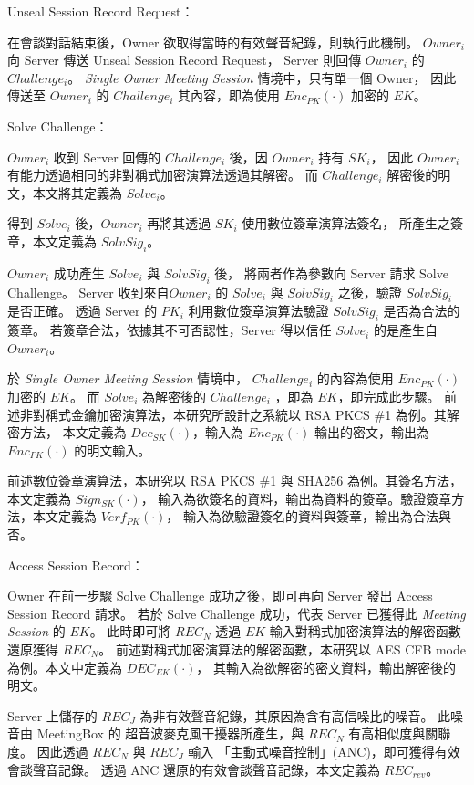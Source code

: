 \begin{steps}
    \item Unseal Session Record Request：

            在會談對話結束後，Owner 欲取得當時的有效聲音紀錄，則執行此機制。
        $Owner_{i}$ 向 Server 傳送 Unseal Session Record Request，
        Server 則回傳 $Owner_{i}$ 的 $Challenge_{i}$。
        {\it Single Owner Meeting Session} 情境中，只有單一個 Owner，
        因此傳送至 $Owner_{i}$ 的 $Challenge_{i}$ 其內容，即為使用 $Enc_{PK}(·)$ 加密的 $EK$。

    \item Solve Challenge：

            $Owner_{i}$ 收到 Server 回傳的 $Challenge_{i}$ 後，因 $Owner_{i}$ 持有 $SK_{i}$，
        因此 $Owner_{i}$ 有能力透過相同的非對稱式加密演算法透過其解密。
        而 $Challenge_{i}$ 解密後的明文，本文將其定義為 $Solve_{i}$。

            得到 $Solve_{i}$ 後，$Owner_{i}$ 再將其透過 $SK_{i}$ 使用數位簽章演算法簽名，
        所產生之簽章，本文定義為 $SolvSig_{i}$。

            $Owner_{i}$ 成功產生 $Solve_{i}$ 與 $SolvSig_{i}$ 後，
        將兩者作為參數向 Server 請求 Solve Challenge。
        Server 收到來自$Owner_{i}$ 的 $Solve_{i}$ 與 $SolvSig_{i}$ 之後，驗證 $SolvSig_{i}$ 是否正確。
        透過 Server 的 $PK_{i}$ 利用數位簽章演算法驗證 $SolvSig_{i}$ 是否為合法的簽章。
        若簽章合法，依據其不可否認性，Server 得以信任 $Solve_{i}$ 的是產生自 $Owner_{i}$。

            於 {\it Single Owner Meeting Session} 情境中，
        $Challenge_{i}$ 的內容為使用 $Enc_{PK}(·)$ 加密的 $EK$。
        而 $Solve_{i}$ 為解密後的 $Challenge_{i}$ ，即為 $EK$，即完成此步驟。
        前述非對稱式金鑰加密演算法，本研究所設計之系統以 RSA PKCS \#1 為例。其解密方法，
        本文定義為 $Dec_{SK}(·)$，輸入為 $Enc_{PK}(·)$ 輸出的密文，輸出為 $Enc_{PK}(·)$ 的明文輸入。

            前述數位簽章演算法，本研究以 RSA PKCS \#1 與 SHA256 為例。其簽名方法，本文定義為 $Sign_{SK}(·)$，
        輸入為欲簽名的資料，輸出為資料的簽章。驗證簽章方法，本文定義為 $Verf_{PK}(·)$，
        輸入為欲驗證簽名的資料與簽章，輸出為合法與否。

    \item Access Session Record：

            Owner 在前一步驟 Solve Challenge 成功之後，即可再向 Server 發出 Access Session Record 請求。
        若於 Solve Challenge 成功，代表 Server 已獲得此 {\it Meeting Session} 的 $EK$。
        此時即可將 $REC_{N}$ 透過 $EK$ 輸入對稱式加密演算法的解密函數還原獲得 $REC_{N}$。
        前述對稱式加密演算法的解密函數，本研究以 AES CFB mode 為例。本文中定義為 $DEC_{EK}(·)$，
        其輸入為欲解密的密文資料，輸出解密後的明文。

            Server 上儲存的 $REC_{J}$ 為非有效聲音紀錄，其原因為含有高信噪比的噪音。
        此噪音由 MeetingBox 的 超音波麥克風干擾器所產生，與 $REC_{N}$ 有高相似度與關聯度。
        因此透過 $REC_{N}$ 與 $REC_{J}$ 輸入 「主動式噪音控制」(ANC)，即可獲得有效會談聲音記錄。
        透過 ANC 還原的有效會談聲音記錄，本文定義為 $REC_{rev}$。
\end{steps}



